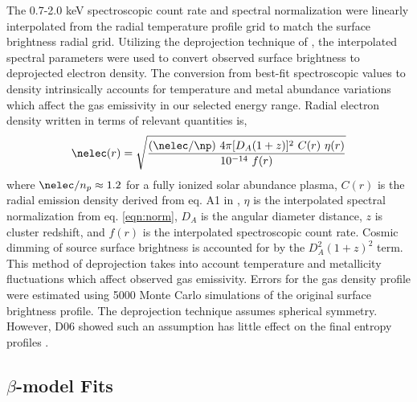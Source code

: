 The 0.7-2.0 keV spectroscopic count rate and spectral normalization
were linearly interpolated from the radial temperature profile grid to
match the surface brightness radial grid. Utilizing the deprojection
technique of \citet{kriss83}, the interpolated spectral parameters
were used to convert observed surface brightness to deprojected
electron density. The conversion from best-fit spectroscopic values to
density intrinsically accounts for temperature and metal abundance
variations which affect the gas emissivity in our selected energy
range. Radial electron density written in terms of relevant quantities
is,
\begin{equation}
\nelec(r) = \sqrt{\frac{(\nelec/\np)~4 \pi [D_A(1+z)]^2~C(r)~\eta(r)}{10^{-14}~f(r)}}
\end{equation}
where $\nelec/n_p \approx 1.2$ for a fully ionized solar abundance
plasma, $C(r)$ is the radial emission density derived from eq. A1 in
\citet{kriss83}, $\eta$ is the interpolated spectral normalization
from eq. \ref{eqn:norm}, $D_A$ is the angular diameter distance, $z$
is cluster redshift, and $f(r)$ is the interpolated spectroscopic
count rate. Cosmic dimming of source surface brightness is accounted
for by the $D_A^2 (1+z)^2$ term. This method of deprojection takes
into account temperature and metallicity fluctuations which affect
observed gas emissivity. Errors for the gas density profile were
estimated using 5000 Monte Carlo simulations of the original surface
brightness profile. The \citet{kriss83} deprojection technique assumes
spherical symmetry. However, D06 showed such an assumption has little
effect on the final entropy profiles \citep[see also][for the low
impact of spherical symmetry assumptions for deriving density
profiles]{2003ApJ...598..190D, 2005MNRAS.359.1481B}.

\subsection{$\beta$-model Fits}
\label{sec:entsuppbeta}

